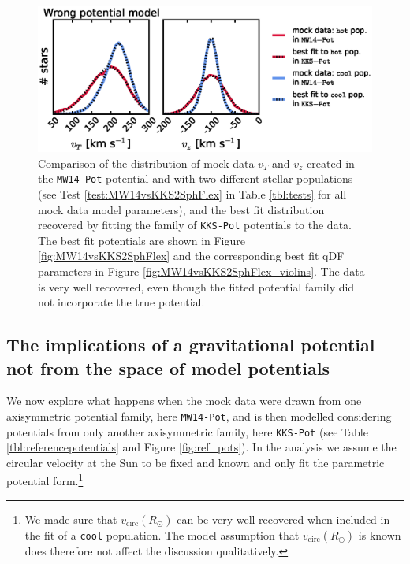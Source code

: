 \begin{figure}[!htbp]
\centering
\includegraphics[width=\columnwidth]{figs/MW14vsKKS2SphFlex_mockdata_residuals_2.eps}
\caption{Comparison of the distribution of mock data $v_T$ and $v_z$ created in the \texttt{MW14-Pot} potential and with two different stellar populations (see Test \ref{test:MW14vsKKS2SphFlex} in Table \ref{tbl:tests} for all mock data model parameters), and the best fit distribution recovered by fitting the family of \texttt{KKS-Pot} potentials to the data. The best fit potentials are shown in Figure \ref{fig:MW14vsKKS2SphFlex} and the corresponding best fit qDF parameters in Figure \ref{fig:MW14vsKKS2SphFlex_violins}. The data is very well recovered, even though the fitted potential family did not incorporate the true potential.}
\label{fig:MW14vsKKS2SphFlex_mockdata_residuals}
\end{figure}





\subsection{The implications of a gravitational potential not from the space of model potentials} \label{sec:results_potential}

We now explore what happens when the mock data were drawn from one axisymmetric potential family, here \texttt{MW14-Pot}, and is then modelled considering potentials from only another axisymmetric family, here \texttt{KKS-Pot} (see Table \ref{tbl:referencepotentials} and Figure \ref{fig:ref_pots}). In the analysis we assume the circular velocity at the Sun to be fixed and known and only fit the parametric potential form.\footnote{We made sure that $v_\text{circ}(R_\odot)$ can be very well recovered when included in the fit of a \texttt{cool} population. The model assumption that $v_\text{circ}(R_\odot)$ is known does therefore not affect the discussion qualitatively.}

